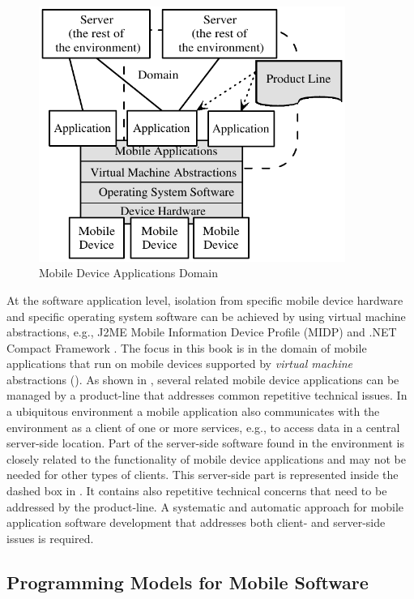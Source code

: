 \begin{figure}[ht]
	\begin{center}
		\includegraphics[width=10cm,height=!]{ch01/mobiledomain}
	\end{center}
	\caption{Mobile Device Applications Domain}
	\label{fig:ch01domain}
\end{figure}

At the software application level, isolation from specific mobile device hardware and specific operating system software can be achieved by using virtual machine abstractions, e.g., J2ME Mobile Information Device Profile (MIDP) \cite{www.j2me} and .NET Compact Framework \cite{dnetcf}. The focus in this book is in the domain of mobile applications that run on mobile devices supported by \textit{virtual machine} abstractions (). As shown in , several related mobile device applications can be managed by a product-line that addresses common repetitive technical issues. In a ubiquitous environment a mobile application also communicates with the environment as a client of one or more services, e.g., to access data in a central server-side location. Part of the server-side software found in the environment is closely related to the functionality of mobile device applications and may not be needed for other types of clients. This server-side part is represented inside the dashed box in . It contains also repetitive technical concerns that need to be addressed by the product-line. A systematic and automatic approach for mobile application software development that addresses both client- and server-side issues is required. 

\subsection{Programming Models for Mobile Software}
\label{mobile.models}

